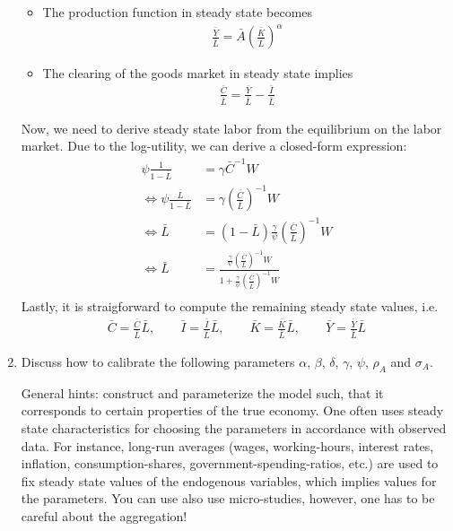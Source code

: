 \documentclass[a4paper]{scrartcl}
\begin{document}
\begin{enumerate}
\begin{solution}
\begin{itemize}
		\item The production function in steady state becomes
		\begin{align*}
			\frac{\bar{Y}}{\bar{L}} = \bar{A} \left(\frac{\bar{K}}{\bar{L}}\right)^\alpha
		\end{align*}
		\item The clearing of the goods market in steady state implies 
		\begin{align*}
		\frac{\bar{C}}{\bar{L}} = \frac{\bar{Y}}{\bar{L}} - \frac{\bar{I}}{\bar{L}}
		\end{align*}
		\end{itemize}
		Now, we need to derive steady state labor from the equilibrium on the labor market. Due to the log-utility, we can derive a closed-form expression:
		\begin{align*}
			\psi \frac{1}{1-\bar{L}} &= \gamma \bar{C}^{-1} W\\
			\Leftrightarrow \psi \frac{\bar{L}}{1-\bar{L}} &= \gamma \left(\frac{\bar{C}}{\bar{L}}\right)^{-1} W\\
			\Leftrightarrow \bar{L} &= (1-\bar{L})\frac{\gamma}{\psi} \left(\frac{\bar{C}}{\bar{L}}\right)^{-1} W\\
			\Leftrightarrow \bar{L} &= \frac{\frac{\gamma}{\psi} \left(\frac{\bar{C}}{\bar{L}}\right)^{-1} W}{1+\frac{\gamma}{\psi} \left(\frac{\bar{C}}{\bar{L}}\right)^{-1} W}\\		
		\end{align*}
		Lastly, it is straigforward to compute the remaining steady state values, i.e.
		\begin{align*}
		\bar{C} = \frac{\bar{C}}{\bar{L}}\bar{L},\qquad
		\bar{I} = \frac{\bar{I}}{\bar{L}}\bar{L},\qquad
		\bar{K} = \frac{\bar{K}}{\bar{L}}\bar{L},	\qquad	
		\bar{Y} = \frac{\bar{Y}}{\bar{L}}\bar{L}
		\end{align*}
		\end{solution}
		\item Discuss how to calibrate the following parameters $\alpha$,  $\beta$, $\delta$, $\gamma$, $\psi$, $\rho_A$ and $\sigma_A$.
		\begin{solution} General hints: construct and parameterize the model such, that it corresponds to certain properties of the true economy. One often uses steady state characteristics for choosing the parameters in accordance with observed data. For instance, long-run averages (wages, working-hours, interest rates, inflation, consumption-shares, government-spending-ratios, etc.) are used to fix steady state values of the endogenous variables, which implies values for the parameters. You can use also use micro-studies, however, one has to be careful about the aggregation!
			

\end{solution}
\end{enumerate}
\end{document}
